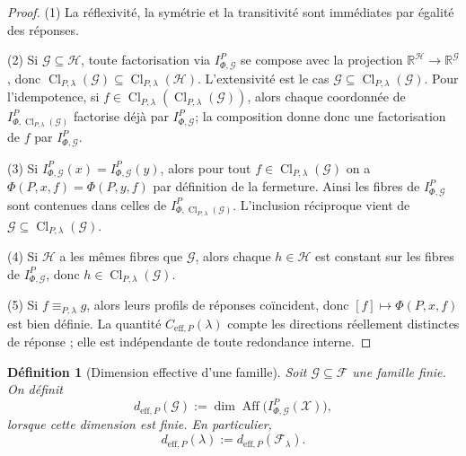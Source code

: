 \documentclass[11pt,a4paper]{article}
\newtheorem{definition}{Définition}
\DeclareMathOperator{\Aff}{Aff}
\begin{document}
\begin{proof}
(1) La réflexivité, la symétrie et la transitivité sont immédiates par égalité des réponses.

(2) Si \(\mathcal G\subseteq\mathcal H\), toute factorisation via \(I_{\Phi,\mathcal G}^P\) se compose avec la projection \(\mathbb R^{\mathcal H}\to\mathbb R^{\mathcal G}\), donc \(\operatorname{Cl}_{P,\lambda}(\mathcal G)\subseteq \operatorname{Cl}_{P,\lambda}(\mathcal H)\). L'extensivité est le cas \(\mathcal G\subseteq \operatorname{Cl}_{P,\lambda}(\mathcal G)\). Pour l'idempotence, si \(f\in \operatorname{Cl}_{P,\lambda}(\operatorname{Cl}_{P,\lambda}(\mathcal G))\), alors chaque coordonnée de \(I_{\Phi,\operatorname{Cl}_{P,\lambda}(\mathcal G)}^P\) factorise déjà par \(I_{\Phi,\mathcal G}^P\); la composition donne donc une factorisation de \(f\) par \(I_{\Phi,\mathcal G}^P\).

(3) Si \(I_{\Phi,\mathcal G}^P(x)=I_{\Phi,\mathcal G}^P(y)\), alors pour tout \(f\in\operatorname{Cl}_{P,\lambda}(\mathcal G)\) on a \(\Phi(P,x,f)=\Phi(P,y,f)\) par définition de la fermeture. Ainsi les fibres de \(I_{\Phi,\mathcal G}^P\) sont contenues dans celles de \(I_{\Phi,\operatorname{Cl}_{P,\lambda}(\mathcal G)}^P\). L'inclusion réciproque vient de \(\mathcal G\subseteq\operatorname{Cl}_{P,\lambda}(\mathcal G)\).

(4) Si \(\mathcal H\) a les mêmes fibres que \(\mathcal G\), alors chaque \(h\in\mathcal H\) est constant sur les fibres de \(I_{\Phi,\mathcal G}^P\), donc \(h\in \operatorname{Cl}_{P,\lambda}(\mathcal G)\).

(5) Si \(f\equiv_{P,\lambda}g\), alors leurs profils de réponses coïncident, donc \([f]\mapsto \Phi(P,x,f)\) est bien définie. La quantité \(C_{\mathrm{eff},P}(\lambda)\) compte les directions réellement distinctes de réponse ; elle est indépendante de toute redondance interne.
\end{proof}

\begin{definition}[Dimension effective d'une famille]
Soit \(\mathcal G\subseteq\mathcal F\) une famille finie. On définit
\[
d_{\mathrm{eff},P}(\mathcal G):=\dim \Aff\!\bigl(I_{\Phi,\mathcal G}^P(\mathcal X)\bigr),
\]
lorsque cette dimension est finie. En particulier,
\[
d_{\mathrm{eff},P}(\lambda):=d_{\mathrm{eff},P}(\mathcal F_\lambda).
\]
\end{definition}
\end{document}
